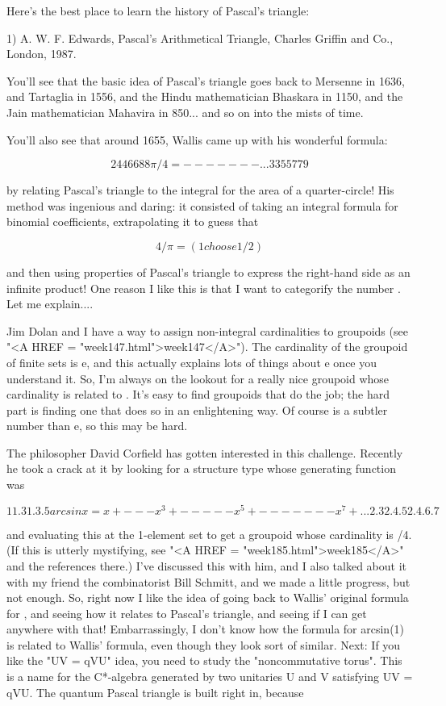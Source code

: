 Here's the best place to learn the history of Pascal's triangle:

1) A. W. F. Edwards, Pascal's Arithmetical Triangle, Charles Griffin
and Co., London, 1987.

You'll see that the basic idea of Pascal's triangle goes back to
Mersenne in 1636, and Tartaglia in 1556, and the Hindu mathematician
Bhaskara in 1150, and the Jain mathematician Mahavira in 850... and
so on into the mists of time.  

You'll also see that around 1655, Wallis came up with his wonderful
formula:


$$

       2 4 4 6 6 8 8 
\pi /4 = - - - - - - - ...
       3 3 5 5 7 7 9 
$$
    
by relating Pascal's triangle to the integral for the area of a 
quarter-circle!  His method was ingenious and daring: it consisted
of taking an integral formula for binomial coefficients, extrapolating 
it to guess that


$$

4/\pi  = (1 choose 1/2)
$$
    
and then using properties of Pascal's triangle to express the right-hand
side as an infinite product!  One reason I like this is that I want
to categorify the number \pi .  Let me explain....

Jim Dolan and I have a way to assign non-integral cardinalities to
groupoids (see "<A HREF = "week147.html">week147</A>").  The
cardinality of the groupoid of finite sets is e, and this actually
explains lots of things about e once you understand it.  So, I'm always
on the lookout for a really nice groupoid whose cardinality is related
to \pi .  It's easy to find groupoids that do the job; the hard part is
finding one that does so in an enlightening way.  Of course \pi  is a
subtler number than e, so this may be hard.

The philosopher David Corfield has gotten interested in this challenge.
Recently he took a crack at it by looking for a structure type whose
generating function was 
 

$$

                  1          1.3          1.3.5
arcsin x =  x +  --- x^{3}  +  -----  x^{5} +  -------  x^{7} + ...
                 2.3        2.4.5        2.4.6.7
$$
    
and evaluating this at the 1-element set to get a groupoid whose
cardinality is \pi /4.  (If this is utterly mystifying, see "<A HREF = "week185.html">week185</A>" 
and the references there.)  I've discussed this with him, and I also talked 
about it with my friend the combinatorist Bill Schmitt, and we made 
a little progress, but not enough.  So, right now I like the idea
of going back to Wallis' original formula for \pi , and seeing how
it relates to Pascal's triangle, and seeing if I can get anywhere
with that!  
Embarrassingly, I don't know how the formula for arcsin(1)
is related to Wallis' formula, even though they look sort of similar.
Next:
If you like the "UV = qVU" idea, you need to study the "noncommutative
torus".  This is a name for the C*-algebra generated by two unitaries U
and V satisfying UV = qVU.  The quantum Pascal triangle is built right
in, because


